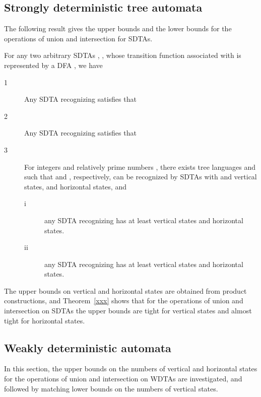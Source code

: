 \documentclass[copyright]{eptcs}
\begin{document}
\subsection{Strongly deterministic tree automata}\label{sdta}












The following result gives the upper bounds and the lower bounds
for the operations of union and intersection for SDTAs.

\begin{theorem}\label{xxx}
For any two arbitrary SDTAs ,
, whose transition function associated with  is
represented by a DFA , we have
\begin{description}
  \item[1] Any SDTA  recognizing  satisfies that 
  \item[2] Any SDTA  recognizing  satisfies that 
  \item[3] For integers  and relatively prime numbers
  , there exists
  tree languages  and  such that  and , respectively, can be
  recognized by SDTAs with  and  vertical states,
   and  horizontal states, and
\begin{description}
  \item[i] any SDTA recognizing  has at least
  vertical
  states and  horizontal states.
  \item[ii] any SDTA recognizing  has at least  vertical
  states and  horizontal states.
\end{description}
\end{description}
\end{theorem}


The upper bounds on vertical and horizontal states are obtained
from product constructions, and Theorem~\ref{xxx} shows that for
the operations of union and intersection on SDTAs the upper bounds
are tight for vertical states and almost tight for horizontal
states.


\subsection{Weakly deterministic automata}\label{wdta}

In this section, the upper bounds on the numbers of vertical and
horizontal states for the operations of union and intersection on
WDTAs are investigated, and followed by matching lower bounds on
the numbers of vertical states.
\end{document}
